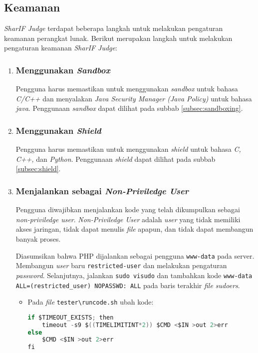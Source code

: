 \subsection{Keamanan}
\textit{SharIF Judge} terdapat beberapa langkah untuk melakukan pengaturan keamanan perangkat lunak. Berikut merupakan langkah untuk melakukan pengaturan keamanan \textit{SharIF Judge}:
\begin{enumerate}
\item \subsubsection{Menggunakan \textit{Sandbox}}
Pengguna harus memastikan untuk menggunakan \textit{sandbox} untuk bahasa \textit{C/C++} dan menyalakan \textit{Java Security Manager (Java Policy)} untuk bahasa \textit{java}. Penggunaan \textit{sandbox} dapat dilihat pada subbab \ref{subsec:sandboxing}.

\item \subsubsection{Menggunakan \textit{Shield}}
Pengguna harus memastikan untuk menggunakan \textit{shield} untuk bahasa \textit{C, C++,} dan \textit{Python}. Penggunaan \textit{shield} dapat dilihat pada subbab \ref{subsec:shield}.

\item \subsubsection{Menjalankan sebagai \textit{Non-Priviledge User}}
Pengguna diwajibkan menjalankan kode yang telah dikumpulkan sebagai \textit{non-priviledge user}. \textit{Non-Priviledge User} adalah \textit{user} yang tidak memiliki akses jaringan, tidak dapat menulis \textit{file} apapun, dan tidak dapat membangun banyak proses.

Diasumsikan bahwa PHP dijalankan sebagai pengguna \verb|www-data| pada server. Membangun \textit{user} baru \verb|restricted-user| dan melakukan pengaturan \textit{password}. Selanjutnya, jalankan \verb|sudo visudo| dan tambahkan kode \verb|www-data ALL=(restricted_user) NOPASSWD: ALL| pada baris terakhir \textit{file sudoers}.
\begin{itemize}

\item Pada \textit{file} \verb|tester\runcode.sh| ubah kode:

\begin{lstlisting}[language=C,caption=Kode \textit{runcode.sh} sebelum ditambahkan, label=kode:runcodebefore]
if $TIMEOUT_EXISTS; then
	timeout -s9 $((TIMELIMITINT*2)) $CMD <$IN >out 2>err
else
	$CMD <$IN >out 2>err        
fi
\end{lstlisting}


\end{itemize}
\end{enumerate}
